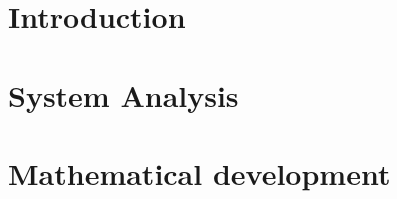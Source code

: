 \documentclass[12pt, twoside]{report}
\begin{document}


\renewcommand{\baselinestretch}{1.5}
\setlength{\parskip}{1em}

\tableofcontents

\listoffigures

\chapter{Introduction}


\chapter{System Analysis}


\chapter{Mathematical development}


\printbibliography%
\nocite{*}
\end{document}
